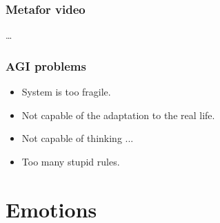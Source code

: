 \documentclass[12pt, aspectratio=169]{beamer}
\begin{document}

\begin{frame}
  \frametitle{Metafor video}
  \ldots
\end{frame}


\begin{frame}
  \frametitle{AGI problems}
  \begin{itemize}
    \item System is too fragile.
    \item Not capable of the adaptation to the real life.
    \item Not capable of thinking ...
    \item Too many stupid rules.
  \end{itemize}
\end{frame}

\section{Emotions}
\end{document}
